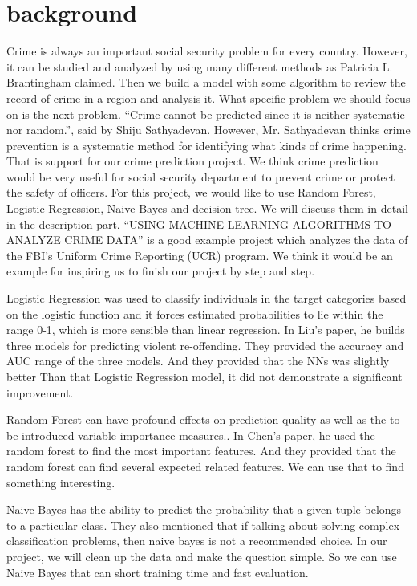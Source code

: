 \documentclass{article}
\begin{document}
\section{background}
Crime is always an important social security problem for every country. However, it can be studied and analyzed by using many different methods as Patricia L. Brantingham claimed.\cite{brantingham1998mapping} Then we build a model with some algorithm to review the record of crime in a region and analysis it. What specific problem we should focus on is the next problem. “Crime cannot be predicted since it is neither systematic nor random.”, said by Shiju Sathyadevan.\cite{sathyadevan2014crime} However, Mr. Sathyadevan thinks crime prevention is a systematic method for identifying what kinds of crime happening. That is support for our crime prediction project. We think crime prediction would be very useful for social security department to prevent crime or protect the safety of officers. For this project, we would like to use Random Forest, Logistic Regression, Naive Bayes and decision tree. We will discuss them in detail in the description part. “USING MACHINE LEARNING ALGORITHMS TO ANALYZE CRIME DATA” is a good example project which analyzes the data of the FBI's Uniform Crime Reporting (UCR) program.\cite{mcclendon2015using} We think it would be an example for inspiring us to finish our project by step and step.

Logistic Regression was used to classify individuals in the target categories based on the logistic function and it forces estimated probabilities to lie within the range 0-1, which is more sensible than linear regression.\cite{liu2011comparison}
In Liu's paper, he builds three models for predicting violent re-offending. They provided the accuracy and AUC range of the three models. And they provided that the NNs was slightly better Than that Logistic Regression model, it did not demonstrate a significant improvement.

Random Forest can have profound effects on prediction quality as well as the to be introduced variable importance measures.\cite{chen2016events}. In Chen's paper, he used the random forest to find the most important features. And they provided that the random forest can find several expected related features. We can use that to find something interesting.

Naive Bayes has the ability to predict the probability that a given tuple belongs to a particular class.\cite{iqbal2013experimental} They also mentioned that if talking about solving complex classification problems, then naive bayes is not a recommended choice. In our project, we will clean up the data and make the question simple. So we can use Naive Bayes that can short training time and fast evaluation.
\end{document}
